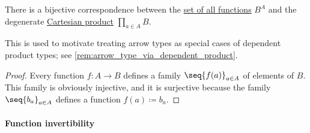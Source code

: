 \begin{proposition}\label{thm:set_of_all_functions_via_cartesian_product}
  There is a bijective correspondence between the \hyperref[def:set_of_all_functions]{set of all functions} \( B^A \) and the degenerate \hyperref[def:cartesian_product]{Cartesian product} \( \prod_{a \in A} B \).
\end{proposition}
\begin{comments}
  \item This is used to motivate treating arrow types as special cases of dependent product types; see \cref{rem:arrow_type_via_dependent_product}.
\end{comments}
\begin{proof}
  Every function \( f: A \to B \) defines a family \( \seq{ f(a) }_{a \in A} \) of elements of \( B \). This family is obviously injective, and it is surjective because the family \( \seq{ b_a }_{a \in A} \) defines a function \( f(a) \coloneqq b_a \).
\end{proof}

\paragraph{Function invertibility}

